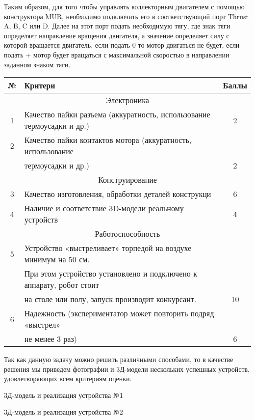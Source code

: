 Таким образом, для того чтобы управлять коллекторным двигателем с помощью конструктора MUR, необходимо подключить его в соответствующий порт Thrust A, B, C или D. Далее на этот порт подать необходимую тягу, где знак тяги определяет направление вращения двигателя, а значение определяет силу с которой вращается двигатель, если подать 0 то мотор двигаться не будет, если подать + мотор будет вращаться с максимальной скоростью в направлении заданном знаком тяги.

\markSection

\begin{table}[H]
    \center
    \small
    \begin{tabular}{|c|l|c|}
        \hline
        № & Критери & Баллы  \\
        \hline
        \multicolumn{3}{|c|}{Электроника} \\
        \hline
        1 & Качество пайки разъема (аккуратность, использование термоусадки и др.) & 2 \\
        \hline
        2 & Качество пайки контактов мотора (аккуратность, использование & \\
          & термоусадки и др.) & 2 \\
        \hline
        \multicolumn{3}{|c|}{Конструирование} \\
        \hline
        3 & Качество изготовления, обработки деталей конструкци & 6 \\
        \hline
        4 & Наличие и соответствие 3D-модели реальному устройств & 4 \\
        \hline
        \multicolumn{3}{|c|}{Работоспособность} \\
        \hline
        5 & Устройство «выстреливает» торпедой на воздухе минимум на 50 см. & \\
          & При этом устройство установлено и подключено к аппарату, робот стоит & \\
          & на столе или полу, запуск производит конкурсант.  & 10 \\
        \hline
        6 & Надежность (экспериментатор может повторить подряд «выстрел»& \\
          & не менее 3 раз) & 6 \\
        \hline
    \end{tabular}
\end{table}

\solutionSection

Так как данную задачу можно решить различными способами, то в качестве решения мы приведем фотографии и 3Д-модели нескольких успешных устройств, удовлетворяющих всем критериям оценки.


\begin{center}
    3Д-модель и реализация устройства №1
\end{center}


\begin{center}
    3Д-модель и реализация устройства №2
\end{center}